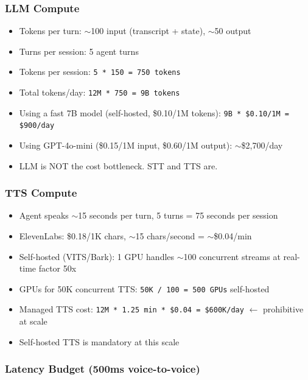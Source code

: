 \subsubsection*{LLM Compute}
\begin{itemize}
  \item Tokens per turn: $\sim$100 input (transcript + state), $\sim$50 output
  \item Turns per session: 5 agent turns
  \item Tokens per session: \texttt{5 * 150 = 750 tokens}
  \item Total tokens/day: \texttt{12M * 750 = 9B tokens}
  \item Using a fast 7B model (self-hosted, \$0.10/1M tokens): \texttt{9B * \$0.10/1M = \$900/day}
  \item Using GPT-4o-mini (\$0.15/1M input, \$0.60/1M output): $\sim$\$2,700/day
  \item LLM is NOT the cost bottleneck. STT and TTS are.
\end{itemize}

\subsubsection*{TTS Compute}
\begin{itemize}
  \item Agent speaks $\sim$15 seconds per turn, 5 turns = 75 seconds per session
  \item ElevenLabs: \$0.18/1K chars, $\sim$15 chars/second = $\sim$\$0.04/min
  \item Self-hosted (VITS/Bark): 1 GPU handles $\sim$100 concurrent streams at real-time factor 50x
  \item GPUs for 50K concurrent TTS: \texttt{50K / 100 = 500 GPUs} self-hosted
  \item Managed TTS cost: \texttt{12M * 1.25 min * \$0.04 = \$600K/day} $\leftarrow$ prohibitive at scale
  \item Self-hosted TTS is mandatory at this scale
\end{itemize}

\subsubsection*{Latency Budget (500ms voice-to-voice)}

